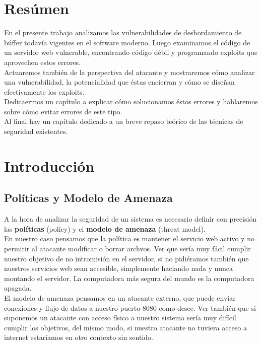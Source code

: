 \documentclass[12pt]{article}
\begin{document}

\tableofcontents
\pagebreak


\section{Resúmen}
En el presente trabajo analizamos las vulnerabilidades de desbordamiento de búffer todavía vigentes en el software moderno. Luego examinamos el código de un servidor web vulnerable, encontrando código débil y programando exploits que aprovechen estos errores. \\
Actuaremos también de la perspectiva del atacante y mostraremos cómo analizar una vulnerabilidad, la potencialidad que éstas encierran y cómo se diseñan efectivamente los exploits. \\
Dedicaermos un capítulo a explicar cómo solucionamos éstos errores y hablaremos sobre cómo evitar errores de este tipo. \\
Al final hay un capítulo dedicado a un breve repaso teórico de las técnicas de seguridad existentes.



\section{Introducción}
\subsection{Políticas y Modelo de Amenaza}
A la hora de analizar la seguridad de un sistema es necesario definir con precisión las \textbf{políticas} (policy) y el \textbf{modelo de amenaza} (threat model). \\

En nuestro caso pensamos que la política es mantener el servicio web activo y no permitir al atacante modificar o borrar archvos. Ver que sería muy fácil cumplir nuestro objetivo de no intromisión en el servidor, si no pidiéramos también que nuestros servicios web sean accesible, simplemente haciando nada y nunca montando el servidor. La computadora más segura del mundo es la computadora apagada. \\

El modelo de amenaza pensamos en un atacante externo, que puede enviar conexiones y flujo de datos a nuestro puerto 8080 como desee. Ver también que si suponemos un atacante con acceso físico a nuestro sistema sería muy difícil cumplir los objetivos, del mismo modo, si nuestro atacante no tuviera acceso a internet estaríamos en otro contexto sin sentido. \\
\end{document}
